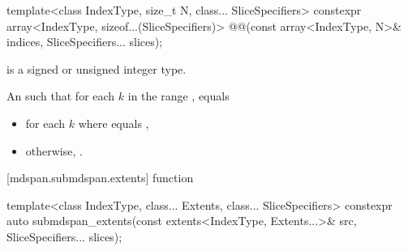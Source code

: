 %
\begin{itemdecl}
template<class IndexType, size_t N, class... SliceSpecifiers>
  constexpr array<IndexType, sizeof...(SliceSpecifiers)>
    @@(const array<IndexType, N>& indices, SliceSpecifiers... slices);
\end{itemdecl}

\begin{itemdescr}
\pnum
\mandates
{} is a signed or unsigned integer type.

\pnum
\returns
An  such that
for each $k$ in the range ,
 equals

\begin{itemize}
\item
 for each $k$
where  equals
,

\item
otherwise,
 \tcode{+}
.
\end{itemize}
\end{itemdescr}

[mdspan.submdspan.extents]{ function}

%
\begin{itemdecl}
template<class IndexType, class... Extents, class... SliceSpecifiers>
  constexpr auto submdspan_extents(const extents<IndexType, Extents...>& src,
                                   SliceSpecifiers... slices);
\end{itemdecl}

